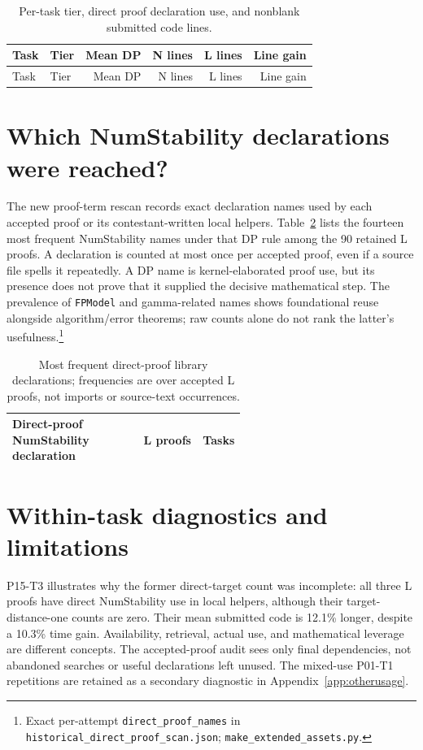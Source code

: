 \documentclass[10pt]{article}
\renewcommand{\arraystretch}{1.12}
\newcommand{\pathref}[1]{\nolinkurl{#1}}
\begin{document}
\begin{longtable}{@{}llrrrr@{}}
\caption{Per-task tier, direct proof declaration use, and nonblank submitted code lines.}\label{tab:tasks}\\
\toprule
Task & Tier & Mean DP & N lines & L lines & Line gain \\\midrule
\endfirsthead
\toprule
Task & Tier & Mean DP & N lines & L lines & Line gain \\\midrule
\endhead

\end{longtable}
\normalsize\setlength{\tabcolsep}{5pt}\renewcommand{\arraystretch}{1.12}

\section{Which NumStability declarations were reached?}
The new proof-term rescan records exact declaration names used by each
accepted proof or its contestant-written local helpers. Table~\ref{tab:directnames}
lists the fourteen most frequent NumStability names under that DP rule
among the 90 retained L proofs. A declaration is counted at most once
per accepted proof, even if a source file spells it repeatedly. A DP
name is kernel-elaborated proof use, but its presence does not prove
that it supplied the decisive mathematical step.
The prevalence of \texttt{FPModel} and gamma-related names shows
foundational reuse alongside algorithm/error theorems; raw counts alone
do not rank the latter's usefulness.\footnote{Exact per-attempt
\pathref{direct_proof_names} in \pathref{historical_direct_proof_scan.json};
\pathref{make_extended_assets.py}.}

\begin{table}[htbp]\centering\small
\begin{tabular}{@{}p{0.57\linewidth}rr@{}}\toprule
Direct-proof NumStability declaration & L proofs & Tasks \\\midrule

\end{tabular}
\caption{Most frequent direct-proof library declarations; frequencies are
over accepted L proofs, not imports or source-text occurrences.}
\label{tab:directnames}
\end{table}

\clearpage
\section{Within-task diagnostics and limitations}
P15-T3 illustrates why the former direct-target count was incomplete:
all three L proofs have direct NumStability use in local helpers,
although their target-distance-one counts are zero. Their mean submitted code
is 12.1\% longer, despite a 10.3\% time gain. Availability, retrieval,
actual use, and mathematical leverage are different concepts. The
accepted-proof audit sees only final dependencies, not abandoned searches
or useful declarations left unused. The mixed-use P01-T1 repetitions
are retained as a secondary diagnostic in Appendix~\ref{app:otherusage}.
\end{document}
